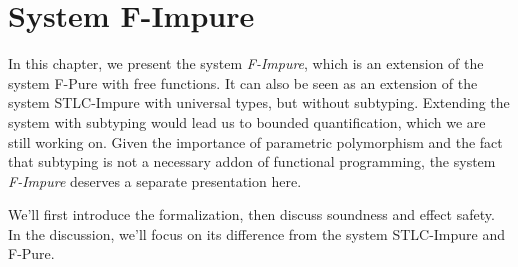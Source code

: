\section{System F-Impure}

In this chapter, we present the system \emph{F-Impure}, which is an
extension of the system F-Pure with free functions. It can also be
seen as an extension of the system STLC-Impure with universal types,
but without subtyping. Extending the system with subtyping would lead
us to bounded quantification, which we are still working on. Given the
importance of parametric polymorphism and the fact that subtyping is
not a necessary addon of functional programming, the system
\emph{F-Impure} deserves a separate presentation here.

We'll first introduce the formalization, then discuss soundness and
effect safety. In the discussion, we'll focus on its difference from
the system STLC-Impure and F-Pure.

